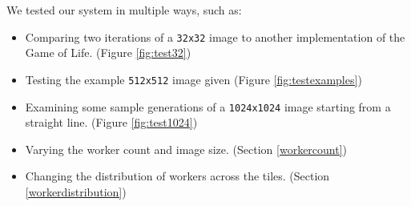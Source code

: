 \documentclass{article}
\begin{document}
    We tested our system in multiple ways, such as:
    
    \begin{itemize}
        \setlength\itemsep{-0.2\baselineskip}
        \item Comparing two iterations of a \verb|32x32| image to another implementation of the Game of Life. (Figure \ref{fig:test32})
        \item Testing the example \verb|512x512| image given (Figure \ref{fig:testexamples})
        \item Examining some sample generations of a \verb|1024x1024| image starting from a straight line. (Figure \ref{fig:test1024})
        \item Varying the worker count and image size. (Section \ref{workercount})
        \item Changing the distribution of workers across the tiles. (Section \ref{workerdistribution})
    \end{itemize}
    
\end{document}
